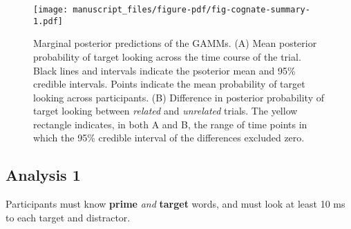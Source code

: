 \documentclass[
  letterpaper,
  DIV=11,
  numbers=noendperiod]{scrartcl}
\begin{document}
\begin{figure}[H]

{\centering \texttt{[image: manuscript\_files/figure-pdf/fig-cognate-summary-1.pdf]}

}

\caption{\label{fig-cognate-summary}Marginal posterior predictions of
the GAMMs. (A) Mean posterior probability of target looking across the
time course of the trial. Black lines and intervals indicate the
psoterior mean and 95\% credible intervals. Points indicate the mean
probability of target looking across participants. (B) Difference in
posterior probability of target looking between \emph{related} and
\emph{unrelated} trials. The yellow rectangle indicates, in both A and
B, the range of time points in which the 95\% credible interval of the
differences excluded zero.}

\end{figure}

\hypertarget{analysis-1}{%
\subsection{Analysis 1}\label{analysis-1}}

Participants must know \textbf{prime} \emph{and} \textbf{target} words,
and must look at least 10 ms to each target and distractor.
\end{document}
